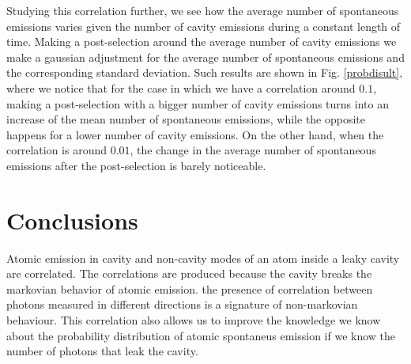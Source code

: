 \documentclass[%
 reprint,
 amsmath,amssymb,
 aps, 
]{revtex4-1}
\begin{document}
Studying this correlation further, we see how the average number of
spontaneous emissions varies given the number of cavity emissions during a constant length of time. Making a 
post-selection around the average number of cavity emissions we make a gaussian
adjustment for the average number of spontaneous emissions and the corresponding 
standard deviation. Such results are shown in Fig. \ref{probdisult}, where we notice that
for the case in which we have a correlation around $0.1$, making a post-selection with a 
bigger number of cavity emissions turns into an increase of the mean number of spontaneous emissions,
 while the opposite happens for a lower number of cavity emissions. On the other hand, when 
the correlation is around $0.01$, the change in the average number of spontaneous emissions
after the post-selection is barely noticeable.

\section{Conclusions}\label{sc:conclusions}
Atomic emission in cavity and non-cavity modes of an atom inside a
leaky cavity are correlated. The correlations are produced because the
cavity breaks the markovian behavior of atomic emission. the presence
of correlation between photons measured in different directions is a
signature of non-markovian behaviour. This correlation also allows us
to improve the knowledge we know about the probability distribution of
atomic spontaneus emission if we know the number of photons that leak
the cavity. 

\end{document}
